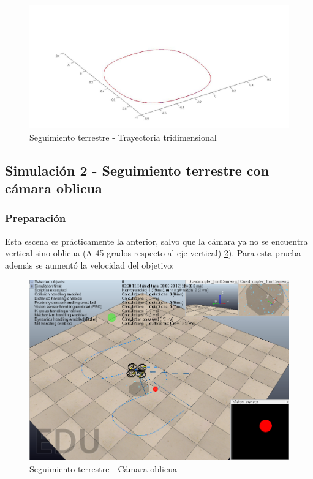 \begin{figure}[ht]
\centering
\includegraphics[width=0.7\linewidth]{../Images/c3/sim1_traj_both_3d}
\caption{Seguimiento terrestre - Trayectoria tridimensional}
\label{fig:sim1_traj_both_3d}
\end{figure}




\subsection{Simulaci\'on 2 - Seguimiento terrestre con c\'amara oblicua}
\subsubsection{Preparaci\'on}
Esta escena es pr\'acticamente la anterior, salvo que la c\'amara ya no se encuentra vertical sino oblicua (A 45 grados respecto al eje vertical) \ref{fig:ground_tracking_scene_oblique}). Para esta prueba adem\'as se aument\'o la velocidad del objetivo:

\begin{figure}[hp]
	\centering
	\includegraphics[width=0.65\linewidth]{../Images/c3/ground_tracking_scene_oblique}
	\caption{Seguimiento terrestre - C\'amara oblicua}
	\label{fig:ground_tracking_scene_oblique}
\end{figure}


